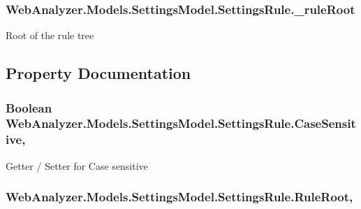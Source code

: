 \subsubsection[{\+\_\+rule\+Root}]{ Web\+Analyzer.\+Models.\+Settings\+Model.\+Settings\+Rule.\+\_\+rule\+Root\hspace{0.3cm}{\ttfamily [private]}}\label{class_web_analyzer_1_1_models_1_1_settings_model_1_1_settings_rule_ab5956bb652dc72145a5de339857f67af}


Root of the rule tree 



\subsection{Property Documentation}
\hypertarget{class_web_analyzer_1_1_models_1_1_settings_model_1_1_settings_rule_ae696484e3ef7781243fd1855d28a9816}{}
\subsubsection[{Case\+Sensitive}]{\setlength{\rightskip}{0pt plus 5cm}Boolean Web\+Analyzer.\+Models.\+Settings\+Model.\+Settings\+Rule.\+Case\+Sensitive\hspace{0.3cm}{\ttfamily [get]}, {\ttfamily [set]}}\label{class_web_analyzer_1_1_models_1_1_settings_model_1_1_settings_rule_ae696484e3ef7781243fd1855d28a9816}


Getter / Setter for Case sensitive 

\hypertarget{class_web_analyzer_1_1_models_1_1_settings_model_1_1_settings_rule_a4f1e8ed93d01d4d4bd68a8482286a0f3}{}
\subsubsection[{Rule\+Root}]{ Web\+Analyzer.\+Models.\+Settings\+Model.\+Settings\+Rule.\+Rule\+Root\hspace{0.3cm}{\ttfamily [get]}, {\ttfamily [set]}}\label{class_web_analyzer_1_1_models_1_1_settings_model_1_1_settings_rule_a4f1e8ed93d01d4d4bd68a8482286a0f3}


